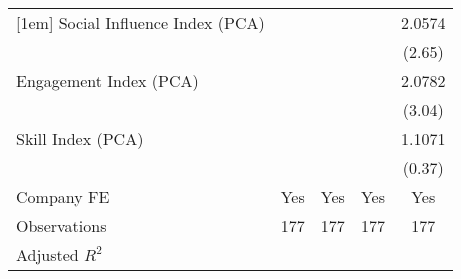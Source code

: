 {\begin{tabular}{l*{4}{c}}
[1em]
Social Influence Index (PCA)       &                   &                   &                   &    2.0574\sym{***}\\
                                   &                   &                   &                   &    (2.65)         \\
[1em]
Engagement Index (PCA)             &                   &                   &                   &    2.0782\sym{***}\\
                                   &                   &                   &                   &    (3.04)         \\
[1em]
Skill Index (PCA)                  &                   &                   &                   &    1.1071         \\
                                   &                   &                   &                   &    (0.37)         \\
[1em]
Company FE                         &       Yes         &       Yes         &       Yes         &       Yes         \\
\hline
Observations                       &       177         &       177         &       177         &       177         \\
Adjusted \(R^{2}\)                 &                   &                   &                   &                   \\
\hline\hline
\end{tabular}
}
